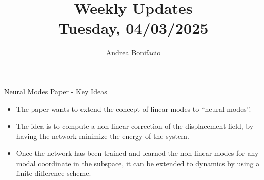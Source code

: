 \documentclass{beamer}
\title{Weekly Updates\\
\tiny{Tuesday, 04/03/2025}}
\author{Andrea Bonifacio}
\date{}
\begin{document}
\begin{frame}
\titlepage
\end{frame}


\begin{frame}{Neural Modes Paper - Key Ideas}
    \begin{itemize}
        \item The paper wants to extend the concept of linear modes to ``neural modes''.
        \item The idea is to compute a non-linear correction of the displacement field, by having the network minimize the energy of the system.
        \item Once the network has been trained and learned the non-linear modes for any modal coordinate in the subspace, it can be extended to dynamics by using a finite difference scheme.
    \end{itemize}
\end{frame}
\end{document}
